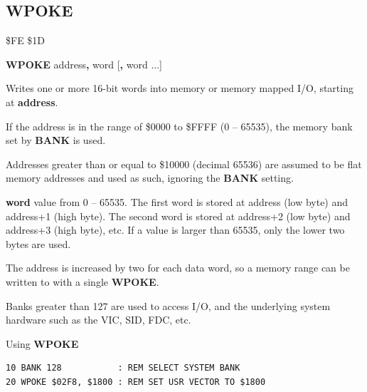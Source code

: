 \subsection{WPOKE}
\begin{description}[leftmargin=2cm,style=nextline]
\item [Token:]    \$FE \$1D

\item [Format:]   {\bf WPOKE} address{\bf,} word [{\bf,} word ...]

\item [Returns:]  Writes one or more 16-bit words into memory or memory mapped I/O, starting at {\bf address}.

                  If the address is in the range of \$0000 to \$FFFF (0 -- 65535), the memory bank set by {\bf BANK} is used.

                  Addresses greater than or equal to \$10000 (decimal 65536) are assumed to be flat memory addresses and used as such, ignoring the {\bf BANK} setting.

                  {\bf word} value from 0 -- 65535. The first word is stored at address (low byte) and address+1 (high byte). The second word is stored at address+2 (low byte) and address+3 (high byte), etc. If a value is larger than 65535, only the lower two bytes are used.

\item [Remarks:]  The address is increased by two for each data word, so a memory range can be written to with a single {\bf WPOKE}.

                  Banks greater than 127 are used to access I/O, and the underlying system hardware such as the VIC, SID, FDC, etc.

\item [Example:]  Using {\bf WPOKE}

\begin{tcolorbox}[colback=black,coltext=white]
\verbatimfont{\codefont}
\begin{verbatim}
10 BANK 128           : REM SELECT SYSTEM BANK
20 WPOKE $02F8, $1800 : REM SET USR VECTOR TO $1800
\end{verbatim}
\end{tcolorbox}
\end{description}


\newpage
